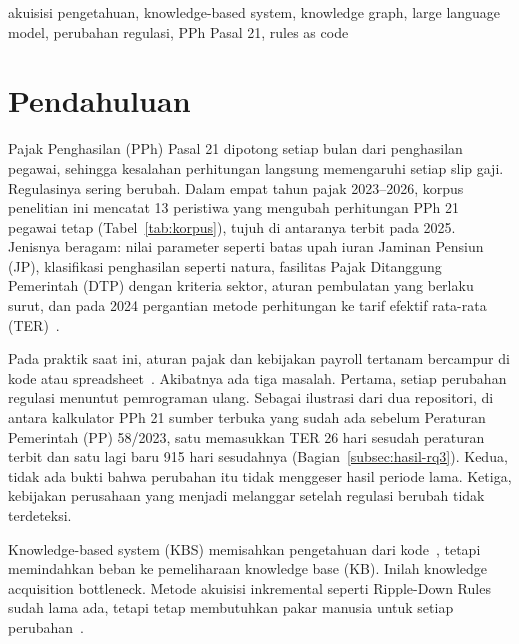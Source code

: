 \documentclass[conference]{IEEEtran}
\makeatletter
\DeclareRobustCommand{\en}[1]{{\usefont{\f@encoding}{\f@family}{\f@series}{it}#1\/}}
\makeatother
\begin{document}
\begin{IEEEkeywords}
akuisisi pengetahuan, \en{knowledge-based system}, \en{knowledge graph}, \en{large language model}, perubahan regulasi, PPh Pasal 21, \en{rules as code}
\end{IEEEkeywords}

\section{Pendahuluan}
\label{sec:pendahuluan}
Pajak Penghasilan (PPh) Pasal 21 dipotong setiap bulan dari penghasilan pegawai, sehingga kesalahan perhitungan langsung memengaruhi setiap slip gaji. Regulasinya sering berubah. Dalam empat tahun pajak 2023--2026, korpus penelitian ini mencatat 13 peristiwa yang mengubah perhitungan PPh 21 pegawai tetap (Tabel~\ref{tab:korpus}), tujuh di antaranya terbit pada 2025. Jenisnya beragam: nilai parameter seperti batas upah iuran Jaminan Pensiun (JP), klasifikasi penghasilan seperti natura, fasilitas Pajak Ditanggung Pemerintah (DTP) dengan kriteria sektor, aturan pembulatan yang berlaku surut, dan pada 2024 pergantian metode perhitungan ke tarif efektif rata-rata (TER)~\cite{pp58_2023,pmk168_2023}.

Pada praktik saat ini, aturan pajak dan kebijakan \en{payroll} tertanam bercampur di kode atau \en{spreadsheet}~\cite{ramadhani2021grossup,yulistyawati2022payroll,kusuma2026pph21}. Akibatnya ada tiga masalah. Pertama, setiap perubahan regulasi menuntut pemrograman ulang. Sebagai ilustrasi dari dua repositori, di antara kalkulator PPh 21 sumber terbuka yang sudah ada sebelum Peraturan Pemerintah (PP) 58/2023, satu memasukkan TER 26 hari sesudah peraturan terbit dan satu lagi baru 915 hari sesudahnya (Bagian~\ref{subsec:hasil-rq3}). Kedua, tidak ada bukti bahwa perubahan itu tidak menggeser hasil periode lama. Ketiga, kebijakan perusahaan yang menjadi melanggar setelah regulasi berubah tidak terdeteksi.

\en{Knowledge-based system} (KBS) memisahkan pengetahuan dari kode~\cite{mowbray2023scaling,merigoux2021catala}, tetapi memindahkan beban ke pemeliharaan \en{knowledge base} (KB). Inilah \en{knowledge acquisition bottleneck}. Metode akuisisi inkremental seperti \en{Ripple-Down Rules} sudah lama ada, tetapi tetap membutuhkan pakar manusia untuk setiap perubahan~\cite{compton2021rdr}.
\end{document}
